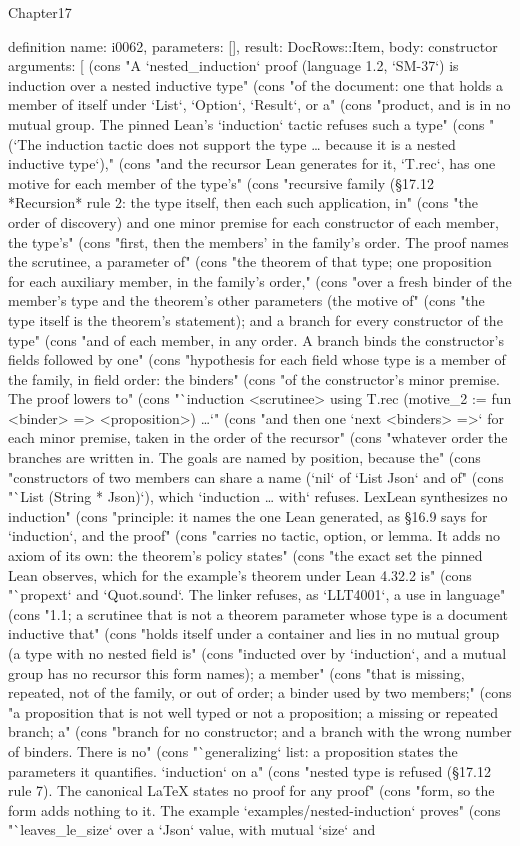 \begin{lexlean}{Chapter17}
\begin{semanticmodule}
definition{
  name: i0062,
  parameters: [],
  result: DocRows::Item,
  body: constructor{
    arguments: [
      (cons "A `nested_induction` proof (language 1.2, `SM-37`) is induction over a nested inductive type" (cons "of the document: one that holds a member of itself under `List`, `Option`, `Result`, or a" (cons "product, and is in no mutual group. The pinned Lean's `induction` tactic refuses such a type" (cons "(`The induction tactic does not support the type … because it is a nested inductive type`)," (cons "and the recursor Lean generates for it, `T.rec`, has one motive for each member of the type's" (cons "recursive family (§17.12 *Recursion* rule 2: the type itself, then each such application, in" (cons "the order of discovery) and one minor premise for each constructor of each member, the type's" (cons "first, then the members' in the family's order. The proof names the scrutinee, a parameter of" (cons "the theorem of that type; one proposition for each auxiliary member, in the family's order," (cons "over a fresh binder of the member's type and the theorem's other parameters (the motive of" (cons "the type itself is the theorem's statement); and a branch for every constructor of the type" (cons "and of each member, in any order. A branch binds the constructor's fields followed by one" (cons "hypothesis for each field whose type is a member of the family, in field order: the binders" (cons "of the constructor's minor premise. The proof lowers to" (cons "`induction <scrutinee> using T.rec (motive_2 := fun <binder> => <proposition>) …`" (cons "and then one `next <binders> =>` for each minor premise, taken in the order of the recursor" (cons "whatever order the branches are written in. The goals are named by position, because the" (cons "constructors of two members can share a name (`nil` of `List Json` and of" (cons "`List (String * Json)`), which `induction … with` refuses. LexLean synthesizes no induction" (cons "principle: it names the one Lean generated, as §16.9 says for `induction`, and the proof" (cons "carries no tactic, option, or lemma. It adds no axiom of its own: the theorem's policy states" (cons "the exact set the pinned Lean observes, which for the example's theorem under Lean 4.32.2 is" (cons "`propext` and `Quot.sound`. The linker refuses, as `LLT4001`, a use in language" (cons "1.1; a scrutinee that is not a theorem parameter whose type is a document inductive that" (cons "holds itself under a container and lies in no mutual group (a type with no nested field is" (cons "inducted over by `induction`, and a mutual group has no recursor this form names); a member" (cons "that is missing, repeated, not of the family, or out of order; a binder used by two members;" (cons "a proposition that is not well typed or not a proposition; a missing or repeated branch; a" (cons "branch for no constructor; and a branch with the wrong number of binders. There is no" (cons "`generalizing` list: a proposition states the parameters it quantifies. `induction` on a" (cons "nested type is refused (§17.12 rule 7). The canonical LaTeX states no proof for any proof" (cons "form, so the form adds nothing to it. The example `examples/nested-induction` proves" (cons "`leaves_le_size` over a `Json` value, with mutual `size` and }}
\end{semanticmodule}
\end{lexlean}
